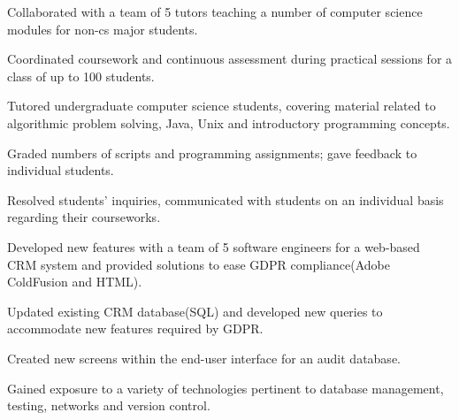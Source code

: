\documentclass[]{ben-resume-openfont}
\begin{document}
\begin{minipage}[t]{0.61\textwidth}
\begin{tightemize}
\item Collaborated with a team of 5 tutors teaching a number of computer science modules for non-cs major students.

\item Coordinated coursework and continuous assessment during practical sessions for a class of up to 100 students.
\end{tightemize}
\sectionsep

\begin{tightemize}
\item Tutored undergraduate computer science students, covering material related to algorithmic problem solving, Java, Unix and introductory programming concepts.

\item Graded numbers of scripts and programming assignments; gave feedback to individual students.

\item Resolved students’ inquiries, communicated with students on an individual basis regarding their courseworks.
\end{tightemize}
\sectionsep

\begin{tightemize}
\item Developed new features with a team of 5 software engineers for a web-based CRM system and provided solutions to ease GDPR compliance(Adobe ColdFusion and HTML).

\item Updated existing CRM database(SQL) and developed new queries to accommodate new features required by GDPR.

\item Created new screens within the end-user interface for an audit database.

\item Gained exposure to a variety of technologies pertinent to database management, testing, networks and version control.
\end{tightemize}
\sectionsep




\nocite{*}

\end{minipage} 
\end{document}
